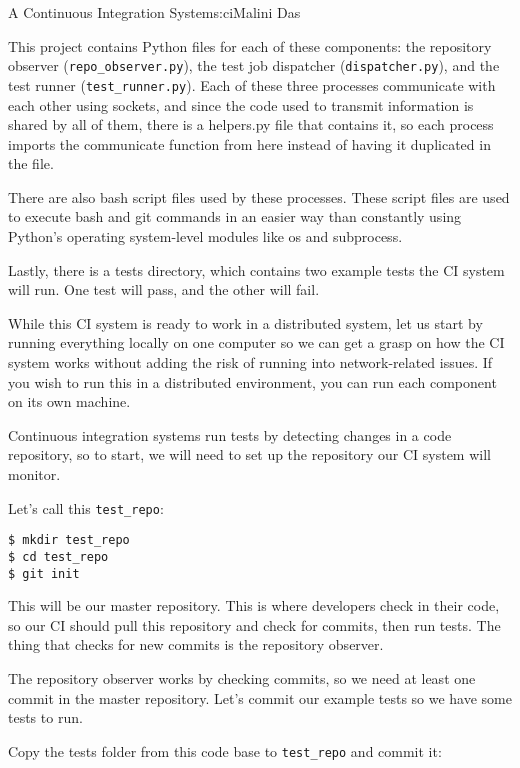 \begin{aosachapter}{A Continuous Integration System}{s:ci}{Malini Das}
\label{files-in-this-project}

This project contains Python files for each of these components: the
repository observer (\texttt{repo\_observer.py}), the test job
dispatcher (\texttt{dispatcher.py}), and the test runner
(\texttt{test\_runner.py}). Each of these three processes communicate
with each other using sockets, and since the code used to transmit
information is shared by all of them, there is a helpers.py file that
contains it, so each process imports the communicate function from here
instead of having it duplicated in the file.

There are also bash script files used by these processes. These script
files are used to execute bash and git commands in an easier way than
constantly using Python's operating system-level modules like os and
subprocess.

Lastly, there is a tests directory, which contains two example tests the
CI system will run. One test will pass, and the other will fail.

\label{initial-setup}

While this CI system is ready to work in a distributed system, let us
start by running everything locally on one computer so we can get a
grasp on how the CI system works without adding the risk of running into
network-related issues. If you wish to run this in a distributed
environment, you can run each component on its own machine.

Continuous integration systems run tests by detecting changes in a code
repository, so to start, we will need to set up the repository our CI
system will monitor.

Let's call this \texttt{test\_repo}:

\begin{verbatim}
$ mkdir test_repo 
$ cd test_repo 
$ git init
\end{verbatim}

This will be our master repository. This is where developers check in
their code, so our CI should pull this repository and check for commits,
then run tests. The thing that checks for new commits is the repository
observer.

The repository observer works by checking commits, so we need at least
one commit in the master repository. Let's commit our example tests so
we have some tests to run.

Copy the tests folder from this code base to \texttt{test\_repo} and
commit it:


\end{aosachapter}
